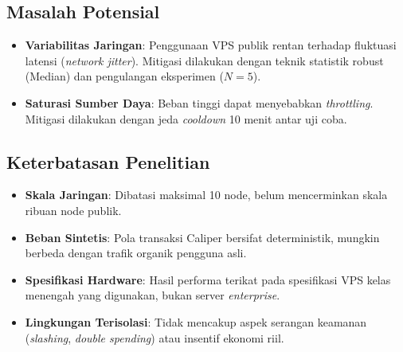 \subsection{Masalah Potensial}
\begin{itemize}
    \item \textbf{Variabilitas Jaringan}: Penggunaan VPS publik rentan terhadap fluktuasi latensi (\textit{network jitter}). Mitigasi dilakukan dengan teknik statistik robust (Median) dan pengulangan eksperimen ($N=5$).
    \item \textbf{Saturasi Sumber Daya}: Beban tinggi dapat menyebabkan \textit{throttling}. Mitigasi dilakukan dengan jeda \textit{cooldown} 10 menit antar uji coba.
\end{itemize}

\subsection{Keterbatasan Penelitian}
\begin{itemize}
    \item \textbf{Skala Jaringan}: Dibatasi maksimal 10 node, belum mencerminkan skala ribuan node publik.
    \item \textbf{Beban Sintetis}: Pola transaksi Caliper bersifat deterministik, mungkin berbeda dengan trafik organik pengguna asli.
    \item \textbf{Spesifikasi Hardware}: Hasil performa terikat pada spesifikasi VPS kelas menengah yang digunakan, bukan server \textit{enterprise}.
    \item \textbf{Lingkungan Terisolasi}: Tidak mencakup aspek serangan keamanan (\textit{slashing}, \textit{double spending}) atau insentif ekonomi riil.
\end{itemize}
